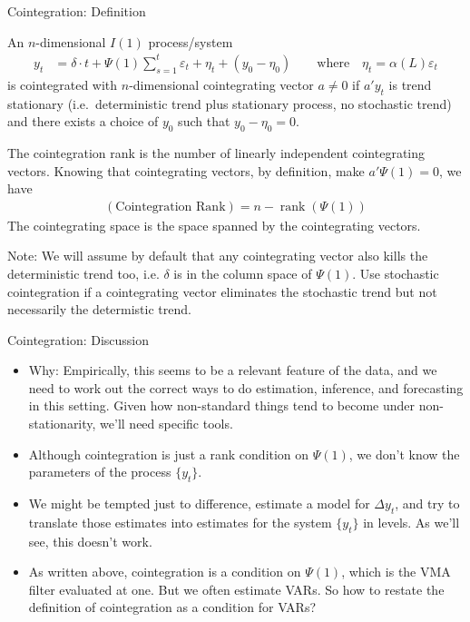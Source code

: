 \documentclass[aspectratio=169, handout]{beamer}
\newcommand{\rank}{\operatorname{rank}}
\begin{document}
{\footnotesize
\begin{frame}{Cointegration: Definition}

An $n$-dimensional $I(1)$ process/system
\begin{align*}
  y_t
  &=
  \delta \cdot t
  +
  \Psi(1)
  \sum_{s=1}^t
  \varepsilon_t
  +
  \eta_t
  +
  (y_0-\eta_0)
  \qquad\text{where}\quad
  \eta_t
  =
  \alpha(L)\varepsilon_t
\end{align*}
is \alert{cointegrated} with $n$-dimensional cointegrating vector
$a\neq 0$ if $a'y_t$ is trend stationary (i.e.\ deterministic trend plus
stationary process, no stochastic trend) and there exists a choice of
$y_0$ such that $y_0-\eta_0=0$.
\pause

The \alert{cointegration rank} is the number of linearly independent
cointegrating vectors. Knowing that cointegrating vectors, by
definition, make $a'\Psi(1)=0$, we have
\begin{align*}
  (\text{Cointegration Rank})
  =
  n - \rank(\Psi(1))
\end{align*}
The \alert{cointegrating space} is the space spanned by the
cointegrating vectors.
\pause

Note: We will assume by default that any cointegrating vector also kills
the deterministic trend too, i.e. $\delta$ is in the column space of
$\Psi(1)$.
Use \alert{stochastic cointegration} if a cointegrating vector
eliminates the stochastic trend but not necessarily the determistic
trend.
\end{frame}
}


{\footnotesize
\begin{frame}{Cointegration: Discussion}
\begin{itemize}
  \item \alert{Why}:
    Empirically, this seems to be a relevant feature of the data, and we
    need to work out the correct ways to do estimation, inference, and
    forecasting in this setting.
    Given how \alert{non-standard} things tend to become under
    non-stationarity, we'll need specific tools.

  \item Although cointegration is just a \alert{rank condition} on
    $\Psi(1)$, we don't know the parameters of the process $\{y_t\}$.

  \item We might be tempted just to \alert{difference}, estimate a model
    for $\Delta y_t$, and try to translate those estimates into
    estimates for the system $\{y_t\}$ in levels.
    As we'll see, this doesn't work.

  \item As written above, cointegration is a condition on $\Psi(1)$,
    which is the VMA filter evaluated at one.
    But we often estimate VARs.
    So how to restate the definition of cointegration as a condition for
    VARs?

\end{itemize}
\end{frame}
}
\end{document}
